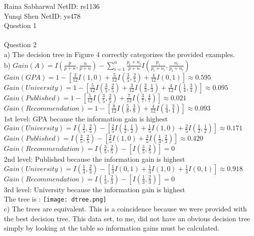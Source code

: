 \documentclass{article}
\begin{document}
Raina Sabharwal NetID: rs1136
\\
Yunqi Shen NetID: ys478
\\
Question 1
\\
\\
Question 2
\\
a) The decision tree in Figure 4 correctly categorizes the provided examples.
\\
b) $Gain(A) = I(\frac{p}{p+n}, \frac{n}{p+n}) - $$\sum_{i=1}^{n} \frac{p_{i} +n_{i}}{p+n}I(\frac{p_{i}}{p_{i}+n_{i}}, \frac{n_{i}}{p_{i}+n_{i}}) $$ $
\\
$Gain(GPA) = 1 - [\frac{3}{12}I(1,0)+\frac{5}{12}I(\frac{3}{5},\frac{2}{5})+\frac{4}{12}I(0,1)] \approx 0.595$
\\
$Gain(University) = 1 -  [\frac{5}{12}I(\frac{3}{5},\frac{2}{5})+\frac{3}{12}I(\frac{2}{3},\frac{1}{3})+\frac{4}{12}I(\frac{1}{4},\frac{3}{4})] \approx 0.095$
\\
$Gain(Published) = 1 -  [\frac{5}{12}I(\frac{3}{5},\frac{2}{5})+\frac{7}{12}I(\frac{3}{7},\frac{4}{7})] \approx 0.021$
\\
$Gain(Recommendation) = 1 -  [\frac{8}{12}I(\frac{5}{8},\frac{3}{8})+\frac{4}{12}I(\frac{1}{4},\frac{3}{4})] \approx 0.093$
\\
1st level: GPA because the information gain is highest
\\
$Gain(University) = I(\frac{3}{5}, \frac{2}{5}) -  [\frac{2}{5}I(\frac{1}{2},\frac{1}{2})+\frac{1}{5}I(1,0)+\frac{2}{5}I(\frac{1}{2},\frac{1}{2})] \approx 0.171$
\\
$Gain(Published) = I(\frac{3}{5}, \frac{2}{5})  -  [\frac{2}{5}I(1,0)+\frac{3}{5}I(\frac{1}{3},\frac{2}{3})] \approx 0.420$
\\
$Gain(Recommendation) = I(\frac{3}{5}, \frac{2}{5})  -  [I(\frac{3}{5},\frac{2}{5})] = 0 $
\\
2nd level: Published because the information gain is highest
\\
$Gain(University) = I(\frac{1}{3}, \frac{2}{3}) -  [\frac{1}{3}I(0,1)+\frac{1}{3}I(1,0)+\frac{1}{3}I(0,1)] \approx 0.918$
\\
$Gain(Recommendation) = I(\frac{1}{3}, \frac{2}{3})  -  [I(\frac{1}{3},\frac{2}{3})] = 0 $
\\
3rd level: University because the information gain is highest
\\
The tree is :
\texttt{[image: dtree.png]}
\\
c) The trees are equivalent. This is a coincidence because we were provided with the best decision tree. This data set, to me, did not have an obvious decision tree simply by looking at the table so information gains must be calculated.
\end{document}
